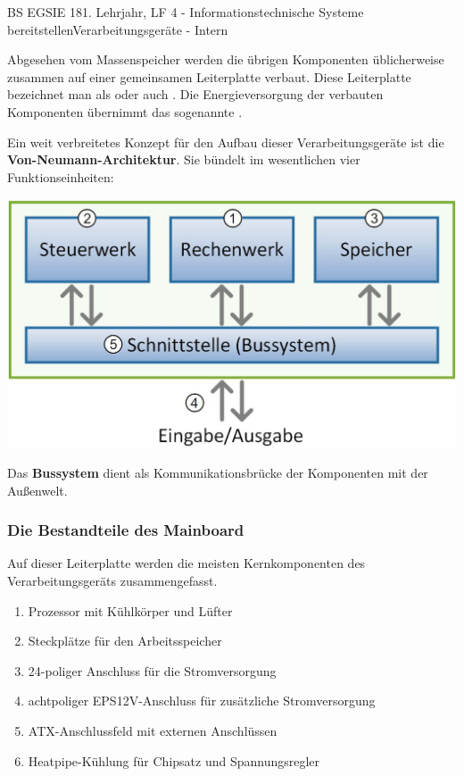 \documentclass[oneside,openany,headings=optiontotoc,11pt,numbers=noenddot]{article}
\begin{document}
\begin{worksheet}{BS EGSIE 18}{1. Lehrjahr, LF 4 - Informationstechnische Systeme bereitstellen}{Verarbeitungsgeräte - Intern}
\begin{itemize}
\begin{itemize}
			\end{itemize}
		\end{itemize}
		Abgesehen vom Massenspeicher werden die übrigen Komponenten üblicherweise zusammen auf einer gemeinsamen Leiterplatte verbaut. Diese Leiterplatte bezeichnet man als \underline{\color{white}{MainboardMainboardMainboard}} oder auch \underline{\color{white}{MotherboardMotherboardMotherboard}}. Die Energieversorgung der verbauten Komponenten übernimmt das sogenannte \underline{\color{white}{NetzteilNetzteilNetzteil}}.\\
		\par\noindent
		Ein weit verbreitetes Konzept für den Aufbau dieser Verarbeitungsgeräte ist die \textbf{Von-Neumann-Architektur}. Sie bündelt im wesentlichen vier Funktionseinheiten:\\
		\par\noindent
		\includegraphics[width=\textwidth]{../99_Bilder/VNA.jpg}\\
		\par\noindent
		Das \textbf{Bussystem} dient als Kommunikationsbrücke der Komponenten mit der Außenwelt.
		\subsubsection*{Die Bestandteile des Mainboard}
		Auf dieser Leiterplatte werden die meisten Kernkomponenten des Verarbeitungsgeräts zusammengefasst.\\
		\par\noindent
		\begin{minipage}{0.35\textwidth}
			\begin{enumerate}
				\item Prozessor mit Kühlkörper und Lüfter
				\item Steckplätze für den Arbeitsspeicher
				\item 24-poliger Anschluss für die Stromversorgung
				\item achtpoliger EPS12V-Anschluss für zusätzliche Stromversorgung
				\item ATX-Anschlussfeld mit externen Anschlüssen
				\item Heatpipe-Kühlung für Chipsatz und Spannungsregler
				

\end{enumerate}
\end{minipage}
\end{worksheet}
\end{document}
